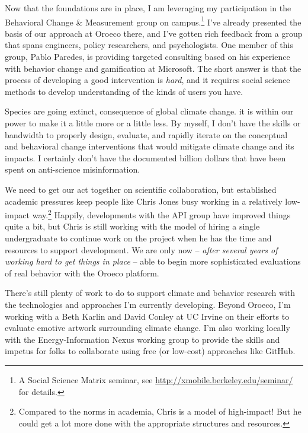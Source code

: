Now that the foundations are in place, I am leveraging my participation in the
Behavioral Change \& Measurement group on campus.\footnote{A Social Science
    Matrix seminar, see \url{http://xmobile.berkeley.edu/seminar/} for details.}
I've already presented the basis of our approach at Oroeco there, and I've
gotten rich feedback from a group that spans engineers, policy researchers, and
psychologists. One member of this group, Pablo Paredes, is providing targeted
consulting based on his experience with behavior change and gamification at
Microsoft. The short answer is that the process of developing a good
intervention is \emph{hard}, and it requires social science methods to develop
understanding of the kinds of users you have.


Species are going extinct, %
consequence of global climate change. %
it is within our power to make it a little more or a little less. By myself, I
don't have the skills or bandwidth to properly design, evaluate, and rapidly
iterate on the conceptual and behavioral change interventions that would
mitigate climate change and its impacts. I certainly don't have the documented
billion dollars that have been spent on anti-science misinformation.

We need to get our act together on scientific collaboration, but established
academic pressures keep people like Chris Jones busy working in a relatively
low-impact way.\footnote{Compared to the norms in academia, Chris is a
    model of high-impact! But he could get a lot more done with the appropriate
    structures and resources.} Happily, developments with the API group have
improved things quite a bit, but Chris is still working with the model of hiring
a single undergraduate to continue work on the project when he has the time and
resources to support development. We are only now -- \emph{after several years
    of working hard to get things in place} -- able to begin more
sophisticated evaluations of real behavior with the Oroeco platform.

There's still plenty of work to do to support climate and behavior research with
the technologies and approaches I'm currently developing. Beyond Oroeco, I'm
working with a Beth Karlin and David Conley at UC Irvine on their efforts to
evaluate emotive artwork surrounding climate change. I'm also working locally
with the Energy-Information Nexus working group to provide the skills and
impetus for folks to collaborate using free (or low-cost) approaches like
GitHub.

